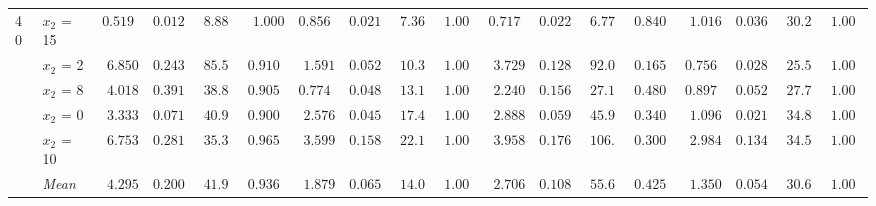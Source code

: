 \begin{table}[htbp]
\begin{tabular}{llrrrrrrrrrrrrrrrr}
\midrule
\multirow{6}{*}{40} & $x_2$ = 15 & {\boldmath$0.5195$} & {\boldmath$0.0128$} & $8.882$ & {\boldmath$1.000$} & $0.8563$ & $0.0214$ & $7.364$ & $1.000$ & $0.7171$ & $0.0222$ & {\boldmath$6.774$} & $0.8400$ & $1.016$ & $0.0368$ & $30.29$ & $1.000$ \\
 & $x_2$ = 2 & $6.850$ & $0.2434$ & $85.51$ & {\boldmath$0.9100$} & $1.591$ & $0.0525$ & {\boldmath$10.31$} & $1.000$ & $3.729$ & $0.1288$ & $92.07$ & $0.1650$ & {\boldmath$0.7563$} & {\boldmath$0.0280$} & $25.59$ & $1.000$ \\
 & $x_2$ = 8 & $4.018$ & $0.3915$ & $38.87$ & {\boldmath$0.9050$} & {\boldmath$0.7749$} & {\boldmath$0.0480$} & {\boldmath$13.18$} & $1.000$ & $2.240$ & $0.1564$ & $27.19$ & $0.4800$ & $0.8975$ & $0.0521$ & $27.75$ & $1.000$ \\
 & $x_2$ = 0 & $3.333$ & $0.0713$ & $40.92$ & {\boldmath$0.9000$} & $2.576$ & $0.0453$ & {\boldmath$17.40$} & $1.000$ & $2.888$ & $0.0597$ & $45.91$ & $0.3400$ & {\boldmath$1.096$} & {\boldmath$0.0212$} & $34.81$ & $1.000$ \\
 & $x_2$ = 10 & $6.753$ & $0.2818$ & $35.39$ & {\boldmath$0.9650$} & $3.599$ & $0.1588$ & {\boldmath$22.14$} & $1.000$ & $3.958$ & $0.1764$ & $106.1$ & $0.3000$ & {\boldmath$2.984$} & {\boldmath$0.1347$} & $34.58$ & $1.000$ \\
 & \textit{Mean} & $4.295$ & $0.2002$ & $41.91$ & \colorbox{green!20}{\boldmath$0.9360$} & $1.879$ & $0.0652$ & \colorbox{green!20}{\boldmath$14.08$} & $1.000$ & $2.706$ & $0.1087$ & $55.61$ & $0.4250$ & \colorbox{green!20}{\boldmath$1.350$} & \colorbox{green!20}{\boldmath$0.0546$} & $30.60$ & $1.000$ \\
\bottomrule
\end{tabular}
\end{table}
